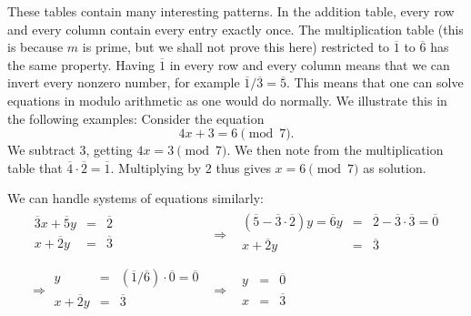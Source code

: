 These tables contain many interesting patterns. In the addition table, every row and
every column contain every entry exactly once. The multiplication table (this is because
$m$ is prime, but we shall not prove this here) restricted to $\overline{1}$ to $\overline{6}$ has the same property.
Having $\overline{1}$ in every row and every column means that we can invert every
nonzero number, for example $\overline{1}/\overline{3}=\overline{5}$. This means that
one can solve equations in modulo arithmetic as one would do normally. We illustrate
this in the following examples:
\medskip
Consider the equation
\[
4x+3=6\pmod{7}.
\]
We subtract $3$, getting $4x=3\pmod{7}$. We then note from the multiplication table that
$\overline{4}\cdot\overline{2}=\overline{1}$. Multiplying by $2$ thus gives
$x=6\pmod{7}$ as solution.

We can handle systems of equations similarly:
\begin{eqnarray*}
\begin{array}{rcl}
\overline{3}x+\overline{5}y&=&\overline{2}\\
x+\overline{2}y&=&\overline{3}\\
\end{array}
&\Rightarrow&
\begin{array}{rcl}
(\overline{5}-\overline{3}\cdot\overline{2})y=\overline{6}y&=&\overline{2}-\overline{3}\cdot\overline{3}=\overline{0}\\
x+\overline{2}y&=&\overline{3}\\
\end{array}\\
\Rightarrow
\begin{array}{rcl}
y&=&(\overline{1}/\overline{6})\cdot\overline{0}=\overline{0}\\
x+\overline{2}y&=&\overline{3}\\
\end{array}
&\Rightarrow&
\begin{array}{rcl}
y&=&\overline{0}\\
x&=&\overline{3}\\
\end{array}
\end{eqnarray*}


